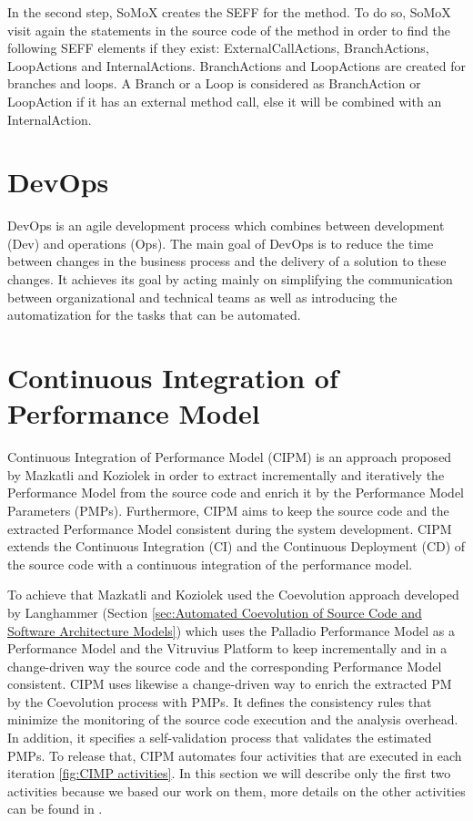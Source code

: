 In the second step, SoMoX creates the SEFF for the method.  To do so, SoMoX visit again the statements in the source code of the method in order to find the following SEFF elements if they exist: ExternalCallActions, BranchActions, LoopActions and InternalActions. BranchActions and LoopActions are created for branches and loops. A Branch or a Loop is considered as BranchAction or LoopAction if it has an external method call, else it will be combined with an InternalAction.

\section{DevOps}
\label{sec:DevOps}
DevOps \cite{brunnert2015performance} is an agile development process which combines between development (Dev) and operations (Ops). The main goal of DevOps is to reduce the time between changes in the business process and the delivery of a solution to these changes. It achieves its goal by acting mainly on simplifying the communication between organizational and technical teams as well as introducing the automatization for the tasks that can be automated. 

\section{Continuous Integration of Performance Model}
\label{sec:Continuous Integration of Performance Model}
Continuous Integration of Performance Model (CIPM) is an approach proposed by Mazkatli and Koziolek \cite{mazkatli2018continuous} in order to extract incrementally and iteratively the Performance Model from the source code and enrich it by the Performance Model Parameters (PMPs). Furthermore, CIPM aims to keep the source code and the extracted Performance Model consistent during the system development. CIPM extends the Continuous Integration (CI) and the Continuous Deployment (CD) of the source code with a continuous integration of the performance model. 

To achieve that Mazkatli and Koziolek used the Coevolution approach developed by Langhammer (Section \ref{sec:Automated Coevolution of Source Code and Software Architecture Models}) which uses the Palladio Performance Model as a Performance Model and the Vitruvius Platform to keep incrementally and in a change-driven way the source code and the corresponding Performance Model consistent. CIPM uses likewise a change-driven way to enrich the extracted PM by the Coevolution process with PMPs. It defines the consistency rules that minimize the monitoring of the source code execution and the analysis overhead. In addition, it specifies a self-validation process that validates the estimated PMPs. To release that, CIPM automates four activities that are executed in each iteration \ref{fig:CIMP activities}. In this section we will describe only the first two activities because we based our work on them, more details on the other activities can be found in \cite{mazkatli2018continuous}.

